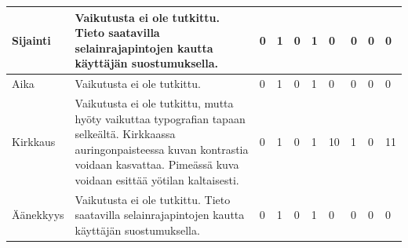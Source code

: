 \documentclass[finnish, 12pt, a4paper, elec, utf8, a-1b, online]{aaltothesis}
\begin{document}
{\begin{longtable}{p{2.5cm}|p{6cm}|p{0.5cm}p{0.5cm}p{0.5cm}|p{0.5cm}|p{0.5cm}p{0.5cm}p{0.5cm}|p{0.5cm}|}
    \midrule
    Sijainti                               & Vaikutusta ei ole tutkittu. Tieto saatavilla selainrajapintojen kautta käyttäjän suostumuksella.                                                                                                                                                                                                                                                                      & 0                                          & 1                                   & 0                                      & 1                            & 0                                               & 0                                         & 0                                         & 0                            \\
    \midrule
    Aika                                   & Vaikutusta ei ole tutkittu.                                                                                                                                                                                                                                                                                                                                           & 0                                          & 1                                   & 0                                      & 1                            & 0                                               & 0                                         & 0                                         & 0                            \\
    \midrule
    Kirkkaus                               & Vaikutusta ei ole tutkittu, mutta hyöty vaikuttaa typografian tapaan selkeältä. Kirkkaassa auringonpaisteessa kuvan kontrastia voidaan kasvattaa. Pimeässä kuva voidaan esittää yötilan kaltaisesti.                                                                                                                                                                  & 0                                          & 1                                   & 0                                      & 1                            & 10                                              & 1                                         & 0                                         & 11                           \\
    \midrule
    Äänekkyys                              & Vaikutusta ei ole tutkittu. Tieto saatavilla selainrajapintojen kautta käyttäjän suostumuksella.                                                                                                                                                                                                                                                                      & 0                                          & 1                                   & 0                                      & 1                            & 0                                               & 0                                         & 0                                         & 0                            \\

\end{longtable}}
\end{document}
